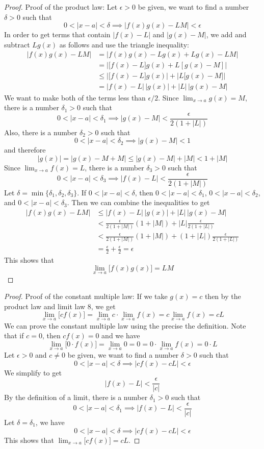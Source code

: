 \begin{proof}
    Proof of the product law:
    Let \(\epsilon>0\) be given,
    we want to find a number \(\delta>0\) such
    that \[0<|x-a|<\delta\implies|f(x)g(x)-LM|<\epsilon\]
    In order to get terms that contain \(|f(x)-L|\) and \(|g(x)-M|\),
    we add
    and subtract \(Lg(x)\) as follows and use the triangle inequality:
    \begin{align*}
        |f(x)g(x)-LM| &= |f(x)g(x)-Lg(x)+Lg(x)-LM| \\
        &= \left|\big[f(x)-L\big]g(x)+L[g(x)-M]\right| \\
        &\leq \left|\big[f(x)-L\big]g(x)\right|
        +\left|L\big[g(x)-M\big]\right| \\
        &= |f(x)-L|\,|g(x)|+|L|\,|g(x)-M|
    \end{align*}
    We want to make both of the terms less than \(\epsilon/2\).
    Since \(\displaystyle{\lim_{x\to a}g(x)=M}\),
    there is a number \(\delta_1>0\) such that
    \[0<|x-a|<\delta_1\implies|g(x)-M|<\frac{\epsilon}{2(1+|L|)}\]
    Also,
    there is a number \(\delta_2>0\) such that
    \[0<|x-a|<\delta_2\implies|g(x)-M|<1\] and therefore
    \[|g(x)|=|g(x)-M+M|\leq|g(x)-M|+|M|<1+|M|\]
    Since \(\displaystyle{\lim_{x\to a}f(x)=L}\),
    there is a number \(\delta_3>0\) such that
    \[0<|x-a|<\delta_3\implies|f(x)-L|<\frac{\epsilon}{2(1+|M|)}\]
    Let \(\delta=\min\{\delta_1,\delta_2,\delta_3\}\).
    If \(0<|x-a|<\delta\),
    then \(0<|x-a|<\delta_1\),
    \(0<|x-a|<\delta_2\),
    and \(0<|x-a|<\delta_3\).
    Then we can combine the inequalities to get
    \begin{align*}
        |f(x)g(x)-LM|
        &\leq |f(x)-L|\,|g(x)|+|L|\,|g(x)-M| \\
        &< \frac{\epsilon}{2(1+|M|)}(1+|M|)+|L|\frac{\epsilon}{2(1+|L|)} \\
        &< \frac{\epsilon}{2(1+|M|)}(1+|M|)
        +(1+|L|)\frac{\epsilon}{2(1+|L|)} \\
        &= \frac{\epsilon}{2}+\frac{\epsilon}{2}=\epsilon
    \end{align*}
    This shows that
    \[\lim_{x\to a}\big[f(x)g(x)\big]=LM\]
\end{proof}
\begin{proof}
    Proof of the constant multiple law:
    If we take \(g(x)=c\) then by the product law and limit law 8,
    we get
    \[\lim_{x\to a}\big[cf(x)\big]=\lim_{x\to a}c\cdot\lim_{x\to a}f(x)
    =c\lim_{x\to a}f(x)=cL\]
    We can prove the constant multiple law using the precise the definition.
    Note that if \(c=0\),
    then \(cf(x)=0\) and we have
    \[\lim_{x\to a}\big[0\cdot f(x)\big]=\lim_{x\to a}0=0
    =0\cdot\lim_{x\to a}f(x)=0\cdot L\]
    Let \(\epsilon>0\) and \(c\neq0\) be given,
    we want to find a number \(\delta>0\) such that
    \[0<|x-a|<\delta\implies|cf(x)-cL|<\epsilon\]
    We simplify to get
    \[|f(x)-L|<\frac{\epsilon}{|c|}\]
    By the definition of a limit,
    there is a number \(\delta_1>0\) such that
    \[0<|x-a|<\delta_1\implies|f(x)-L|<\frac{\epsilon}{|c|}\]
    Let \(\delta=\delta_1\),
    we have
    \[0<|x-a|<\delta\implies|cf(x)-cL|<\epsilon\]
    This shows that \(\displaystyle{\lim_{x\to a}\big[cf(x)\big]=cL}\).
\end{proof}
